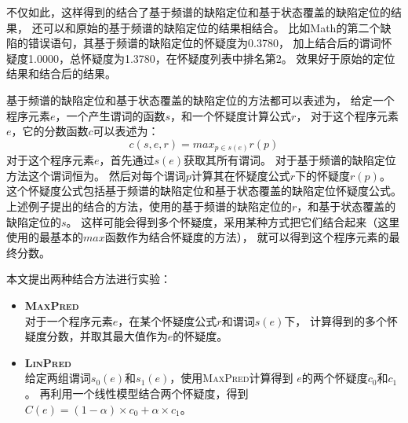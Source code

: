 不仅如此，这样得到的结合了基于频谱的缺陷定位和基于状态覆盖的缺陷定位的结果，
还可以和原始的基于频谱的缺陷定位的结果相结合。
比如Math的第二个缺陷的错误语句，其基于频谱的缺陷定位的怀疑度为0.3780，
加上结合后的谓词怀疑度1.0000，总怀疑度为1.3780，在怀疑度列表中排名第2。
效果好于原始的定位结果和结合后的结果。

基于频谱的缺陷定位和基于状态覆盖的缺陷定位的方法都可以表述为，
给定一个程序元素$e$，一个产生谓词的函数$s$，和一个怀疑度计算公式$r$，
对于这个程序元素$e$，它的分数函数$c$可以表述为：
$$
c(s,e,r) = max_{p \in s(e)}r(p)
$$
对于这个程序元素$e$，首先通过$s(e)$获取其所有谓词。
对于基于频谱的缺陷定位方法这个谓词恒为。
然后对每个谓词$p$计算其在怀疑度公式$r$下的怀疑度$r(p)$。
这个怀疑度公式包括基于频谱的缺陷定位和基于状态覆盖的缺陷定位怀疑度公式。
上述例子提出的结合的方法，使用的基于频谱的缺陷定位的$r$，和基于状态覆盖的缺陷定位的$s$。
这样可能会得到多个怀疑度，采用某种方式把它们结合起来（这里使用的最基本的$max$函数作为结合怀疑度的方法），
就可以得到这个程序元素的最终分数。

本文提出两种结合方法进行实验：
\begin{itemize}
\item \textbf{\textsc{MaxPred}} \\
对于一个程序元素$e$，在某个怀疑度公式$r$和谓词$s(e)$下，
计算得到的多个怀疑度分数，并取其最大值作为$e$的怀疑度。
\item \textbf{\textsc{LinPred}} \\
给定两组谓词$s_0(e)$和$s_1(e)$，使用\textsc{MaxPred}计算得到
$e$的两个怀疑度$c_0$和$c_1$。
再利用一个线性模型结合两个怀疑度，得到$C(e) = (1 - \alpha) \times c_0 + \alpha \times c_1$。
\end{itemize}


